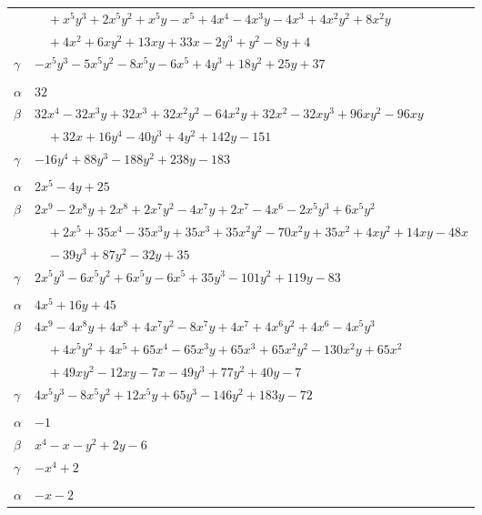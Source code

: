 \documentclass[11pt]{article}
\begin{document}
\begin{longtable}{@{}ll@{}}
 & $\quad +x^{5}y^{3}+2x^{5}y^{2}+x^{5}y-x^{5}+4x^{4}-4x^{3}y-4x^{3}+4x^{2}y^{2}+8x^{2}y$\\
 & $\quad +4x^{2}+6xy^{2}+13xy+33x-2y^{3}+y^{2}-8y+4$\\
$\gamma$ & $-x^{5}y^{3}-5x^{5}y^{2}-8x^{5}y-6x^{5}+4y^{3}+18y^{2}+25y+37$\\
\addlinespace[3pt]
\multicolumn{2}{@{}l}{$\{i,j\}=\{7,16\}$, $k_{ij}=7^{3}$}\\
$\alpha$ & $32$\\
$\beta$ & $32x^{4}-32x^{3}y+32x^{3}+32x^{2}y^{2}-64x^{2}y+32x^{2}-32xy^{3}+96xy^{2}-96xy$\\
 & $\quad +32x+16y^{4}-40y^{3}+4y^{2}+142y-151$\\
$\gamma$ & $-16y^{4}+88y^{3}-188y^{2}+238y-183$\\
\addlinespace[3pt]
\multicolumn{2}{@{}l}{$\{i,j\}=\{7,22\}$, $k_{ij}=3^{3}\cdot 5$}\\
$\alpha$ & $2x^{5}-4y+25$\\
$\beta$ & $2x^{9}-2x^{8}y+2x^{8}+2x^{7}y^{2}-4x^{7}y+2x^{7}-4x^{6}-2x^{5}y^{3}+6x^{5}y^{2}$\\
 & $\quad +2x^{5}+35x^{4}-35x^{3}y+35x^{3}+35x^{2}y^{2}-70x^{2}y+35x^{2}+4xy^{2}+14xy-48x$\\
 & $\quad -39y^{3}+87y^{2}-32y+35$\\
$\gamma$ & $2x^{5}y^{3}-6x^{5}y^{2}+6x^{5}y-6x^{5}+35y^{3}-101y^{2}+119y-83$\\
\addlinespace[3pt]
\multicolumn{2}{@{}l}{$\{i,j\}=\{7,23\}$, $k_{ij}=5\cdot 7^{2}$}\\
$\alpha$ & $4x^{5}+16y+45$\\
$\beta$ & $4x^{9}-4x^{8}y+4x^{8}+4x^{7}y^{2}-8x^{7}y+4x^{7}+4x^{6}y^{2}+4x^{6}-4x^{5}y^{3}$\\
 & $\quad +4x^{5}y^{2}+4x^{5}+65x^{4}-65x^{3}y+65x^{3}+65x^{2}y^{2}-130x^{2}y+65x^{2}$\\
 & $\quad +49xy^{2}-12xy-7x-49y^{3}+77y^{2}+40y-7$\\
$\gamma$ & $4x^{5}y^{3}-8x^{5}y^{2}+12x^{5}y+65y^{3}-146y^{2}+183y-72$\\
\addlinespace[3pt]
\multicolumn{2}{@{}l}{$\{i,j\}=\{8,14\}$, $k_{ij}=2^{2}$}\\
$\alpha$ & $-1$\\
$\beta$ & $x^{4}-x-y^{2}+2y-6$\\
$\gamma$ & $-x^{4}+2$\\
\addlinespace[3pt]
\multicolumn{2}{@{}l}{$\{i,j\}=\{8,17\}$, $k_{ij}=2^{2}\cdot 3$}\\
$\alpha$ & $-x-2$\\

\end{longtable}
\end{document}
